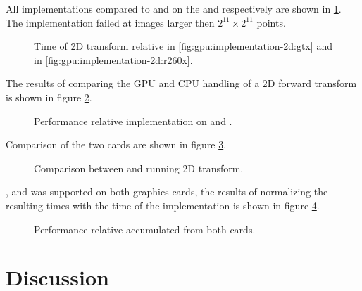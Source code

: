 All implementations compared to {\CU} and {\OCL} on the {\NVCARD} and {\AMDCARD}respectively are shown in \ref{fig:gpu:implementation-2d}. The {\GL} implementation failed at images larger then $2^{11}{\times}2^{11}$ points.

\begin{figure}
	\centering
	\subfloat[\NVCARD\label{fig:gpu:implementation-2d:gtx}]{	
		
	}
	\vfill
	\subfloat[\AMDCARD\label{fig:gpu:implementation-2d:r260x}]{
		
	}	
	\caption{Time of 2D transform relative {\CU} in \ref{fig:gpu:implementation-2d:gtx} and {\OCL} in \ref{fig:gpu:implementation-2d:r260x}.}
	\label{fig:gpu:implementation-2d}
\end{figure}

The results of comparing the \gls{GPU} and \gls{CPU} handling of a \gls{2D} forward transform is shown in figure \ref{fig:gtx:cpu-2d}.

\begin{figure}
	\centering
	
	\caption{Performance relative {\CU} implementation on {\NVCARD} and {\INTELCPU}.}
	\label{fig:gtx:cpu-2d}
\end{figure}

Comparison of the two cards are shown in figure \ref{fig:gpu-comparison-2d}.

\begin{figure}
	\centering
	
	\caption{Comparison between {\AMDCARD} and {\NVCARD} running 2D transform.}
	\label{fig:gpu-comparison-2d}
\end{figure}

{\DX}, {\GL} and {\OCL} was supported on both graphics cards, the results of normalizing the resulting times with the time of the {\OCL} implementation is shown in figure \ref{fig:gpu-comparison-tech-2d}.

\begin{figure}
	\centering
	
	\caption{Performance relative {\OCL} accumulated from both cards.}
	\label{fig:gpu-comparison-tech-2d}
\end{figure}

\newpage

\section{Discussion}

